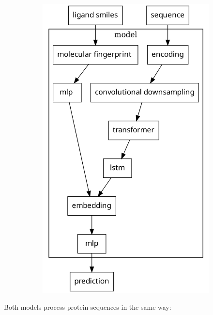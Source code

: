 \documentclass{article}
\begin{document}
\begin{figure}[H]
\begin{subfigure}{0.49\linewidth}
		\includegraphics[width=\textwidth]{figs/rio-fp.png}
	\end{subfigure}
\end{figure}
\par 
Both models process protein sequences in the same way:
\end{document}
